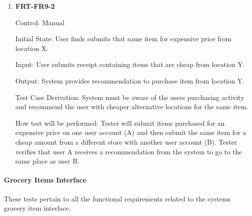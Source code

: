 \documentclass[12pt, titlepage]{article}
\begin{document}
\begin{enumerate}
\item{\textbf{FRT-FR9-2}}

Control: Manual
          
Initial State: User finds submits that same item for expensive price from location X.

Input: User submits receipt containing items that are cheap from location Y.
          
Output: System provides recommendation to purchase item from location Y.

Test Case Derivation: System must be aware of the users purchasing activity and recommend the user with cheaper alternative locations for the same item.
          
How test will be performed: Tester will submit items purchased for an expensive price on one user account (A) and then submit the same item for a cheap amount from a different store with another user account (B). Tester verifies that user A receives a recommendation from the system to go to the same place as user B.

\end{enumerate}

\paragraph{Grocery Items Interface}

These tests pertain to all the functional requirements related to the systems grocery item interface.
\end{document}
